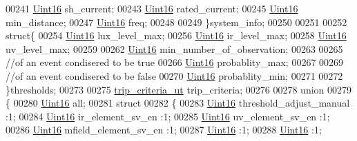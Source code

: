 \begin{DoxyCode}
00241         \hyperlink{a00072_a59a9f6be4562c327cbfb4f7e8e18f08b}{Uint16}                              sh\_current;
00243         \hyperlink{a00072_a59a9f6be4562c327cbfb4f7e8e18f08b}{Uint16}                              rated\_current;
00245         \hyperlink{a00072_a59a9f6be4562c327cbfb4f7e8e18f08b}{Uint16}                              min\_distance;
00247         \hyperlink{a00072_a59a9f6be4562c327cbfb4f7e8e18f08b}{Uint16}                              freq;
00248 
00249         \}system\_info;
00250 
00251 
00252         \textcolor{keyword}{struct}\{
00254         \hyperlink{a00072_a59a9f6be4562c327cbfb4f7e8e18f08b}{Uint16}                              lux\_level\_max;
00256         \hyperlink{a00072_a59a9f6be4562c327cbfb4f7e8e18f08b}{Uint16}                              ir\_level\_max;
00258         \hyperlink{a00072_a59a9f6be4562c327cbfb4f7e8e18f08b}{Uint16}                              uv\_level\_max;
00259 
00262         \hyperlink{a00072_a59a9f6be4562c327cbfb4f7e8e18f08b}{Uint16}                              min\_number\_of\_observation;
00263 
00265         \textcolor{comment}{//of an event condisered to be true}
00266         \hyperlink{a00072_a59a9f6be4562c327cbfb4f7e8e18f08b}{Uint16}                              probablity\_max;
00267 
00269         \textcolor{comment}{//of an event condisered to be false}
00270         \hyperlink{a00072_a59a9f6be4562c327cbfb4f7e8e18f08b}{Uint16}                              probablity\_min;
00271 
00272         \}thresholds;
00273 
00275         \hyperlink{a00022_d8/d64/a00828}{trip\_criteria\_ut}                    trip\_criteria;
00276 
00278         \textcolor{keyword}{union}
00279         \{
00280            \hyperlink{a00072_a59a9f6be4562c327cbfb4f7e8e18f08b}{Uint16}                           all;
00281            \textcolor{keyword}{struct}
00282            \{
00283               \hyperlink{a00072_a59a9f6be4562c327cbfb4f7e8e18f08b}{Uint16}                        threshold\_adjust\_manual :1;
00284               \hyperlink{a00072_a59a9f6be4562c327cbfb4f7e8e18f08b}{Uint16}                        ir\_element\_sv\_en        :1;
00285               \hyperlink{a00072_a59a9f6be4562c327cbfb4f7e8e18f08b}{Uint16}                        uv\_element\_sv\_en        :1;
00286               \hyperlink{a00072_a59a9f6be4562c327cbfb4f7e8e18f08b}{Uint16}                        mfield\_element\_sv\_en    :1;
00287               \hyperlink{a00072_a59a9f6be4562c327cbfb4f7e8e18f08b}{Uint16}                                                :1;
00288               \hyperlink{a00072_a59a9f6be4562c327cbfb4f7e8e18f08b}{Uint16}                                                :1;

\end{DoxyCode}
